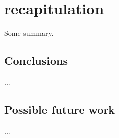 \section{recapitulation}
    Some summary.

    \subsection{Conclusions}
        ...

    \subsection{Possible future work}
        ...
